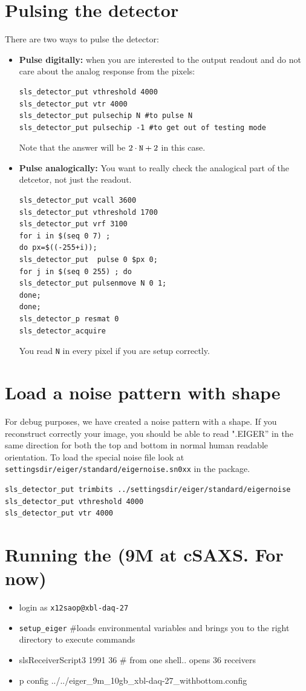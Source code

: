 \documentclass{article}
\begin{document}
\section{Pulsing the detector}
There are two ways to pulse the detector: 
\begin{itemize}
\item \textbf{Pulse digitally:} when you are interested to the output readout and do not care about the analog response from the pixels:
 \begin{verbatim}
sls_detector_put vthreshold 4000
sls_detector_put vtr 4000
sls_detector_put pulsechip N #to pulse N
sls_detector_put pulsechip -1 #to get out of testing mode 
\end{verbatim}
Note that the answer will be $2 \cdot \textrm{{\tt{N}}} +2$ in this case.

\item  \textbf{Pulse analogically:} You want to really check the analogical part of the detcetor, not just the readout.

 \begin{verbatim}
sls_detector_put vcall 3600
sls_detector_put vthreshold 1700
sls_detector_put vrf 3100
for i in $(seq 0 7) ; 
do px=$((-255+i)); 
sls_detector_put  pulse 0 $px 0;
for j in $(seq 0 255) ; do
sls_detector_put pulsenmove N 0 1;
done;
done;
sls_detector_p resmat 0
sls_detector_acquire
\end{verbatim}
You read {\tt{N}} in every pixel if you are setup correctly. 
\end{itemize}
 
\section{Load a noise pattern with shape}
For debug purposes, we have created a noise pattern with a shape. If you reconstruct correctly your image, you should be able to read ".EIGER'' in the same direction for both the top and bottom in normal human readable orientation.
To load the special noise file look at {\tt{settingsdir/eiger/standard/eigernoise.sn0xx}} in the package. 
\begin{verbatim}
sls_detector_put trimbits ../settingsdir/eiger/standard/eigernoise
sls_detector_put vthreshold 4000
sls_detector_put vtr 4000
\end{verbatim}

\section{Running the (9M at cSAXS. For now)}
\begin{itemize}
\item login as {\tt{x12saop@xbl-daq-27}}
\item {\tt{setup\_eiger}} \#loads environmental variables and brings you to the right directory to execute commands
\item slsReceiverScript3 1991 36 \# from one shell.. opens 36 receivers
\item p config ../../eiger\_9m\_10gb\_xbl-daq-27\_withbottom.config
\end{itemize}
\end{document}
